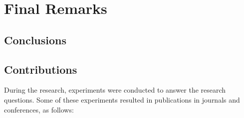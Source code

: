 \chapter{Final Remarks} \label{cap:final_remarks}

\section{Conclusions}


%     

\section{Contributions}

During the research, experiments were conducted to answer the research questions. Some of these experiments resulted in publications in journals and conferences, as follows:


